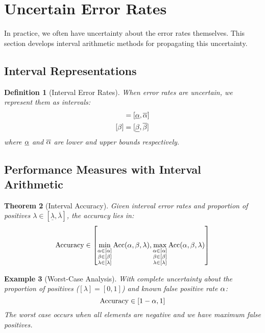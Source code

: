 \documentclass[11pt,final,hidelinks]{article}
\newtheorem{theorem}{Theorem}[section]
\newtheorem{definition}[theorem]{Definition}
\newtheorem{example}[theorem]{Example}
\newcommand{\Interval}[2]{[#1, #2]}
\begin{document}
\section{Uncertain Error Rates}

In practice, we often have uncertainty about the error rates themselves. This section develops interval arithmetic methods for propagating this uncertainty.

\subsection{Interval Representations}

\begin{definition}[Interval Error Rates]
When error rates are uncertain, we represent them as intervals:
\begin{align}
[\fprate] &= \Interval{\underline{\fprate}}{\overline{\fprate}} \\
[\fnrate] &= \Interval{\underline{\fnrate}}{\overline{\fnrate}}
\end{align}
where $\underline{\alpha}$ and $\overline{\alpha}$ are lower and upper bounds respectively.
\end{definition}

\subsection{Performance Measures with Interval Arithmetic}

\begin{theorem}[Interval Accuracy]
Given interval error rates and proportion of positives $\lambda \in [\underline{\lambda}, \overline{\lambda}]$, the accuracy lies in:
\begin{equation}
\text{Accuracy} \in \left[\min_{\substack{\alpha \in [\alpha] \\ \beta \in [\beta] \\ \lambda \in [\lambda]}} \text{Acc}(\alpha, \beta, \lambda), \max_{\substack{\alpha \in [\alpha] \\ \beta \in [\beta] \\ \lambda \in [\lambda]}} \text{Acc}(\alpha, \beta, \lambda)\right]
\end{equation}
\end{theorem}

\begin{example}[Worst-Case Analysis]
With complete uncertainty about the proportion of positives ($[\lambda] = [0,1]$) and known false positive rate $\alpha$:
\begin{equation}
\text{Accuracy} \in [1-\alpha, 1]
\end{equation}
The worst case occurs when all elements are negative and we have maximum false positives.
\end{example}
\end{document}
